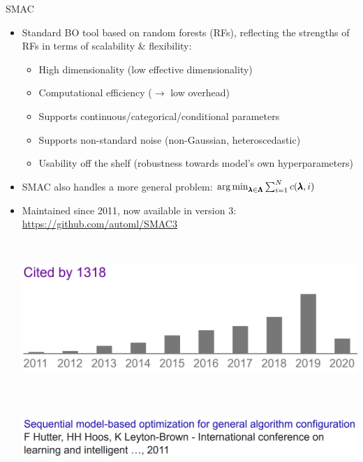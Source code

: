 \begin{frame}[c]{SMAC  }

\begin{itemize}
    \item Standard BO tool based on random forests (RFs), reflecting the strengths of RFs in terms of \alert{scalability \& flexibility}:
    \begin{itemize}
        \item High dimensionality (low effective dimensionality)
        \item Computational efficiency ($\rightarrow$ low overhead)
        \item Supports continuous/categorical/conditional parameters
        \item Supports non-standard noise (non-Gaussian, heteroscedastic)
        \item Usability off the shelf (robustness towards model's own hyperparameters)
    \end{itemize}

\fhpause
\smallskip
    \item SMAC also handles a more general problem:
    $\operatorname*{arg\,min}_{\pmb{\lambda}\in\pmb{\Lambda}} \sum_{i=1}^N c(\pmb{\lambda},i)$
\fhpause
\smallskip
    \item Maintained since 2011, now available in version 3: \url{https://github.com/automl/SMAC3}

\begin{columns}
~\\
\includegraphics[width=1\linewidth, keepaspectratio=true]{images/success_stories/SMAC_citations.png}
~\\
~\\
~\\
\includegraphics[width=1\linewidth, keepaspectratio=true]{images/success_stories/SMAC_paper.png}
~\\
\end{columns}    
\end{itemize}
\end{frame}

